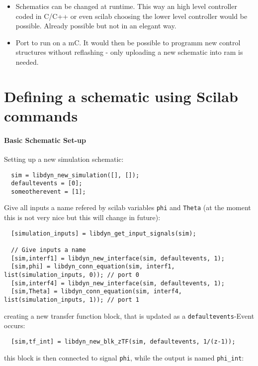 \documentclass[%
	pdftex,%
	a4paper,%
	oneside,%
	11pt,%
	halfparskip,%
	headsepline,%
	bibtotocnumbered,%
	idxtotoc%
]{scrartcl}
\begin{document}
\begin{itemize}
  \item Schematics can be changed at runtime. This way an high level controller coded in C/C++ or even scilab choosing the lower level controller would be possible. Already possible but not in an elegant way.
  \item Port to run on a mC. It would then be possible to programm new control structures without reflashing - only uploading a new schematic into ram is needed.
\end{itemize}


\section{Defining a schematic using Scilab commands}

\paragraph{Basic Schematic Set-up}

Setting up a new simulation schematic:

\begin{verbatim}
  sim = libdyn_new_simulation([], []);
  defaultevents = [0];
  someotherevent = [1]; 
\end{verbatim}

Give all inputs a name refered by scilab variables \texttt{phi} and \texttt{Theta} (at the moment this is not very nice but this will change in future):

\begin{verbatim}
  [simulation_inputs] = libdyn_get_input_signals(sim);
  
  // Give inputs a name
  [sim,interf1] = libdyn_new_interface(sim, defaultevents, 1);
  [sim,phi] = libdyn_conn_equation(sim, interf1, list(simulation_inputs, 0)); // port 0
  [sim,interf4] = libdyn_new_interface(sim, defaultevents, 1);
  [sim,Theta] = libdyn_conn_equation(sim, interf4, list(simulation_inputs, 1)); // port 1
\end{verbatim}

creating a new transfer function block, that is updated as a \texttt{defaultevents}-Event occurs:

\begin{verbatim}  
  [sim,tf_int] = libdyn_new_blk_zTF(sim, defaultevents, 1/(z-1));
\end{verbatim}

this block is then connected to signal \texttt{phi}, while the output is named \texttt{phi\_int}:
\end{document}
